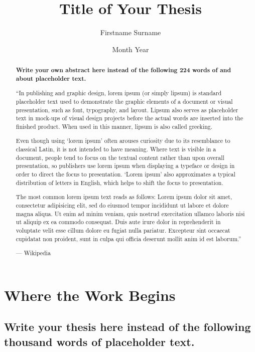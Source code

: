 \documentclass{icldt}
\title{Title of Your Thesis}
\author{Firstname Surname}
\date{Month Year}
\begin{document}
\maketitle

\begin{abstract}
\textbf{Write your own abstract here instead of the following 224 words of
and about placeholder text.}

``In publishing and graphic design, lorem ipsum (or simply lipsum) is standard
placeholder text used to demonstrate the graphic elements of a document or
visual presentation, such as font, typography, and layout. Lipsum also serves as
placeholder text in mock-ups of visual design projects before the actual words
are inserted into the finished product. When used in this manner, lipsum is also
called greeking.

Even though using `lorem ipsum' often arouses curiosity due to its resemblance
to classical Latin, it is not intended to have meaning. Where text is visible in
a document, people tend to focus on the textual content rather than upon overall
presentation, so publishers use lorem ipsum when displaying a typeface or design
in order to direct the focus to presentation. `Lorem ipsum' also approximates a
typical distribution of letters in English, which helps to shift the focus to
presentation.

The most common lorem ipsum text reads as follows: Lorem ipsum dolor sit amet,
consectetur adipisicing elit, sed do eiusmod tempor incididunt ut labore et
dolore magna aliqua. Ut enim ad minim veniam, quis nostrud exercitation ullamco
laboris nisi ut aliquip ex ea commodo consequat. Duis aute irure dolor in
reprehenderit in voluptate velit esse cillum dolore eu fugiat nulla pariatur.
Excepteur sint occaecat cupidatat non proident, sunt in culpa qui officia
deserunt mollit anim id est laborum.''

\hfill --- Wikipedia
\end{abstract}

\makededication

\tableofcontents
\listoftables
\listoffigures

\chapter{Where the Work Begins}
\section{Write your thesis here instead of the following thousand
words of placeholder text.}
\end{document}
